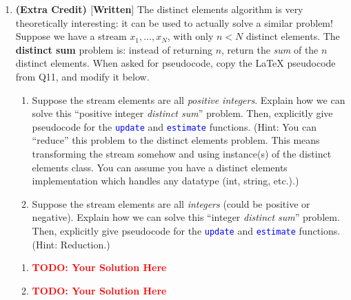 \documentclass[12pt]{article}
\def\code#1{\textcolor{blue}{\texttt{#1}}}
\def\todo#1{\textcolor{red}{\textbf{#1}}}
\renewcommand{\|}{\mid}
\begin{document}
\begin{enumerate}
\item \textbf{(Extra Credit) $[$Written$]$} The distinct elements algorithm is very theoretically interesting: it can be used to actually solve a similar problem! Suppose we have a stream $x_1,\dots,x_N$, with only $n<N$ distinct elements. The \textbf{distinct sum} problem is: instead of returning $n$, return the \textit{sum} of the $n$ distinct elements. When asked for pseudocode, copy the LaTeX pseudocode from Q11, and modify it below.
\begin{enumerate}
    \item Suppose the stream elements are all \textit{positive integers}. Explain how we can solve this ``positive integer \textit{distinct sum}'' problem. Then, explicitly give pseudocode for the \code{update} and \code{estimate} functions. (Hint: You can ``reduce'' this problem to the distinct elements problem. This means transforming the stream somehow and using instance(s) of the distinct elements class. You can assume you have a distinct elements implementation which handles any datatype (int, string, etc.).)
    \item Suppose the stream elements are all \textit{integers} (could be positive or negative). Explain how we can solve this ``integer \textit{distinct sum}'' problem. Then, explicitly give pseudocode for the \code{update} and \code{estimate} functions. (Hint: Reduction.)
  \end{enumerate}
\begin{tcolorbox}
\begin{enumerate}
\item \todo{TODO: Your Solution Here}
\item \todo{TODO: Your Solution Here}
\end{enumerate}
\end{tcolorbox}

\end{enumerate}
\end{document}
